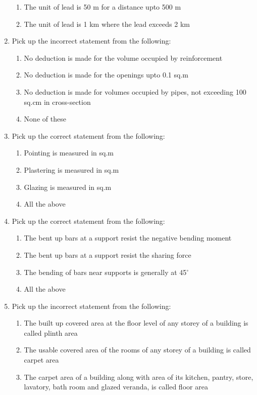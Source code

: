 \documentclass[11pt,a4paper]{article}
\begin{document}
\begin{enumerate}
\begin{enumerate}[label=\Alph*.]
\item{The unit of lead is 50 m for a distance upto 500 m}
\item{The unit of lead is 1 km where the lead exceeds 2 km}
\end{enumerate}
\item{Pick up the incorrect statement from the following:}
\begin{enumerate}[label=\Alph*.]
\item{No deduction is made for the volume occupied by reinforcement}
\item{No deduction is made for the openings upto 0.1 sq.m}
\item{No deduction is made for volumes occupied by pipes, not exceeding 100 sq.cm in cross-section}
\item{None of these}
\end{enumerate}
\item{Pick up the correct statement from the following:}
\begin{enumerate}[label=\Alph*.]
\item{Pointing is measured in sq.m}
\item{Plastering is measured in sq.m}
\item{Glazing is measured in sq.m}
\item{All the above}
\end{enumerate}
\item{Pick up the correct statement from the following:}
\begin{enumerate}[label=\Alph*.]
\item{The bent up bars at a support resist the negative bending moment}
\item{The bent up bars at a support resist the sharing force}
\item{The bending of bars near supports is generally at 45$^\circ$}
\item{All the above}
\end{enumerate}
\item{Pick up the incorrect statement from the following:}
\begin{enumerate}[label=\Alph*.]
\item{The built up covered area at the floor level of any storey of a building is called plinth area}
\item{The usable covered area of the rooms of any storey of a building is called carpet area}
\item{The carpet area of a building along with area of its kitchen, pantry, store, lavatory, bath room and glazed veranda, is called floor area}

\end{enumerate}
\end{enumerate}
\end{document}
